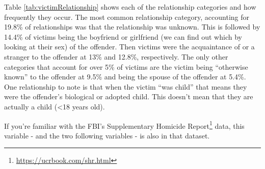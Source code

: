 \documentclass[
]{krantz}
\renewcommand{\href}[2]{#2\footnote{\url{#1}}}
\begin{document}
Table \ref{tab:victimRelationship} shows each of the
relationship categories and how frequently they occur. The
most common relationship category, accounting for 19.8\% of
relationships was that the relationship was unknown. This is
followed by 14.4\% of victims being the boyfriend or
girlfriend (we can find out which by looking at their sex)
of the offender. Then victims were the acquaintance of or a
stranger to the offender at 13\% and 12.8\%, respectively.
The only other categories that account for over 5\% of
victims are the victim being ``otherwise known'' to the
offender at 9.5\% and being the spouse of the offender at
5.4\%. One relationship to note is that when the victim
``was child'' that means they were the offender's biological
or adopted child. This doesn't mean that they are actually a
child (\textless18 years old).

If you're familiar with the FBI's
\href{https://ucrbook.com/shr.html}{Supplementary Homicide
Report} data, this variable - and the two following
variables - is also in that dataset.
\end{document}
